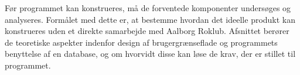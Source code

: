 \label{sec:teori}
Før programmet kan konstrueres, må de forventede komponenter undersøges og analyseres. Formålet med dette er, at bestemme hvordan det ideelle produkt kan konstrueres uden et direkte samarbejde med Aalborg Roklub. Afsnittet berører de teoretiske aspekter indenfor design af brugergrænseflade og programmets benyttelse af en database, og om hvorvidt disse kan løse de krav, der er stillet til programmet.

